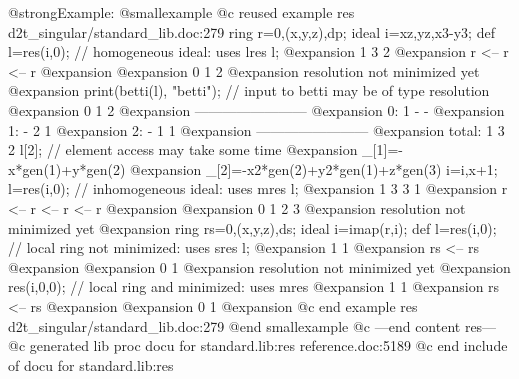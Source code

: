 {{{{{{@strong{Example:}
@smallexample
@c reused example res d2t_singular/standard_lib.doc:279 
  ring r=0,(x,y,z),dp;
ideal i=xz,yz,x3-y3;
def l=res(i,0); // homogeneous ideal: uses lres
l;
@expansion{}  1      3      2      
@expansion{} r <--  r <--  r
@expansion{} 
@expansion{} 0      1      2      
@expansion{} resolution not minimized yet
@expansion{} 
print(betti(l), "betti"); // input to betti may be of type resolution
@expansion{}            0     1     2
@expansion{} ------------------------
@expansion{}     0:     1     -     -
@expansion{}     1:     -     2     1
@expansion{}     2:     -     1     1
@expansion{} ------------------------
@expansion{} total:     1     3     2
l[2];         // element access may take some time
@expansion{} _[1]=-x*gen(1)+y*gen(2)
@expansion{} _[2]=-x2*gen(2)+y2*gen(1)+z*gen(3)
i=i,x+1;
l=res(i,0);   // inhomogeneous ideal: uses mres
l;
@expansion{}  1      3      3      1      
@expansion{} r <--  r <--  r <--  r
@expansion{} 
@expansion{} 0      1      2      3      
@expansion{} resolution not minimized yet
@expansion{} 
ring rs=0,(x,y,z),ds;
ideal i=imap(r,i);
def l=res(i,0); // local ring not minimized: uses sres
l;
@expansion{}   1       1       
@expansion{} rs <--  rs
@expansion{} 
@expansion{} 0       1       
@expansion{} resolution not minimized yet
@expansion{} 
res(i,0,0);     // local ring and minimized: uses mres
@expansion{}   1       1       
@expansion{} rs <--  rs
@expansion{} 
@expansion{} 0       1       
@expansion{} 
@c end example res d2t_singular/standard_lib.doc:279
@end smallexample
@c ---end content res---
@c generated lib proc docu for standard.lib:res reference.doc:5189 
@c end include of docu for standard.lib:res

}}}}}}
